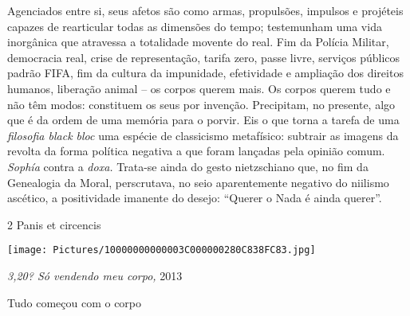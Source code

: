 Agenciados entre si, seus afetos são como armas, propulsões, impulsos e
projéteis capazes de rearticular todas as dimensões do tempo;
testemunham uma vida inorgânica que atravessa a totalidade movente do
real. Fim da Polícia Militar, democracia real, crise de representação,
tarifa zero, passe livre, serviços públicos padrão FIFA, fim da cultura
da impunidade, efetividade e ampliação dos direitos humanos, liberação
animal -- os corpos querem mais. Os corpos querem tudo e não têm modos:
constituem os seus por invenção. Precipitam, no presente, algo que é da
ordem de uma memória para o porvir. Eis o que torna a tarefa de uma
\emph{filosofia black bloc} uma espécie de classicismo metafísico:
subtrair as imagens da revolta da forma política negativa a que foram
lançadas pela opinião comum. \emph{Sophía} contra a \emph{doxa.}
Trata-se ainda do gesto nietzschiano que, no fim da Genealogia da Moral,
perscrutava, no seio aparentemente negativo do niilismo ascético, a
positividade imanente do desejo: ``Querer o Nada é ainda querer''.

2 Panis et circencis

\texttt{[image: Pictures/10000000000003C000000280C838FC83.jpg]}

\emph{3,20? Só vendendo meu corpo, }2013

Tudo começou com o corpo

